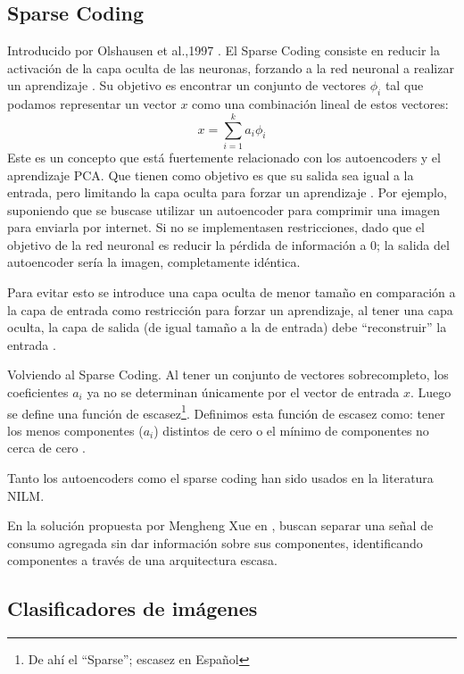 \subsection{Sparse Coding}
Introducido por Olshausen et al.,1997 \autocite{OLSHAUSEN}. El Sparse Coding consiste en reducir la activación de la capa oculta de las neuronas, forzando a la red neuronal a realizar un aprendizaje \autocite{stanfordSparse}.
Su objetivo es encontrar un conjunto de vectores $\phi_i$ tal que podamos representar un vector $x$ como una combinación lineal de estos vectores: 
$$
x = \sum_{i=1}^{k}a_i\phi_i
$$
Este es un concepto que está fuertemente relacionado con los autoencoders y el aprendizaje PCA. Que tienen como objetivo es que su salida sea igual a la entrada, pero limitando la capa oculta para forzar un aprendizaje \autocite{stanfordAutoEncoding}.
Por ejemplo, suponiendo que se buscase utilizar un autoencoder para comprimir una imagen para enviarla por internet. Si no se implementasen restricciones, dado que el objetivo de la red neuronal es reducir la pérdida de información a 0; la salida del autoencoder sería la imagen, completamente idéntica.

Para evitar esto se introduce una capa oculta de menor tamaño en comparación a la capa de entrada como restricción para forzar un aprendizaje, al tener una capa oculta, la capa de salida (de igual tamaño a la de entrada) debe \enquote{reconstruir} la entrada \autocite{stanfordAutoEncoding} .

Volviendo al Sparse Coding. Al tener un conjunto de vectores sobrecompleto, los coeficientes $a_i$ ya no se determinan únicamente por el vector de entrada $x$. Luego se define una función de escasez\footnote{De ahí el \enquote{Sparse}; escasez en Español}. Definimos esta función de escasez como: tener los menos componentes ($a_i$) distintos de cero o el mínimo de componentes no cerca de cero \autocite{stanfordSparse}.

Tanto los autoencoders como el sparse coding han sido usados en la literatura NILM.

En la solución propuesta por Mengheng Xue en \autocite{SparseCodingNILM}, buscan separar una señal de consumo agregada sin dar información sobre sus componentes, identificando componentes a través de una arquitectura escasa. 

\subsection{Clasificadores de imágenes}
\autocite{Radoslav2023}

